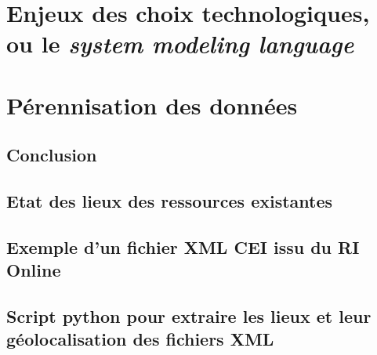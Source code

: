 \documentclass[a4paper,12pt,twoside]{book}
\begin{document}
    
    
    
	
	\part{Enjeux des choix technologiques, ou le \textit{system modeling language}}
    
    
    

    \part{Pérennisation des données}
	
	\chapter*{Conclusion}
	
	\appendix

        \chapter[Etat de l'existant]{Etat des lieux des ressources existantes}
            \begin{landscape}
                 
            \end{landscape}

        \chapter[Schéma XML CEI]{Exemple d'un fichier XML CEI issu du RI Online}
            
        
	\chapter[Extraction des lieux]{Script python pour extraire les lieux et leur géolocalisation des fichiers XML}
            
	
	\backmatter





	\tableofcontents
	
\end{document}
